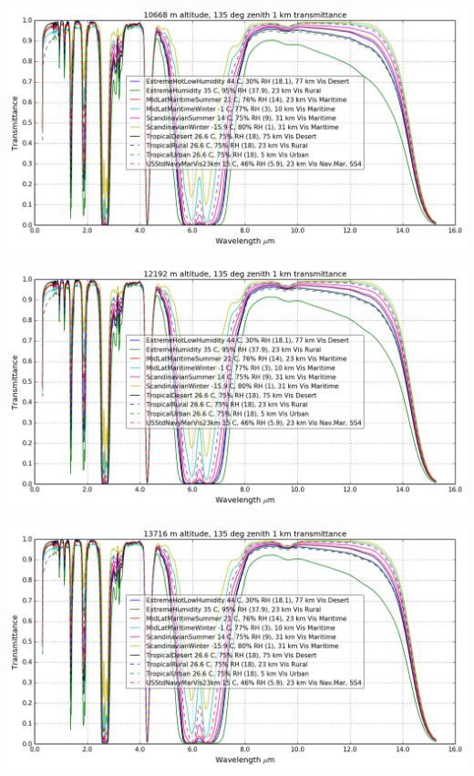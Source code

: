 \documentclass{workpackage}
\begin{document}
\begin{center}
\includegraphics{./pic/Analyse-Standard-Atmospheres_17_18.png}
\end{center}

\begin{center}
\includegraphics{./pic/Analyse-Standard-Atmospheres_17_19.png}
\end{center}

\begin{center}
\includegraphics{./pic/Analyse-Standard-Atmospheres_17_20.png}
\end{center}
\end{document}
